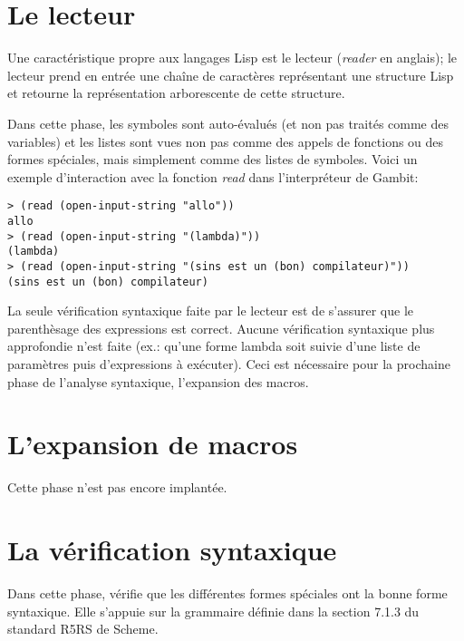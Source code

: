 \documentclass[11pt]{report}
\begin{document}
\section{Le lecteur}

Une caractéristique propre aux langages Lisp est le lecteur
(\emph{reader} en anglais); le lecteur prend en entrée une chaîne de
caractères représentant une structure Lisp et retourne la
représentation arborescente de cette structure.

Dans cette phase, les symboles sont auto-évalués (et non pas traités
comme des variables) et les listes sont vues non pas comme des appels
de fonctions ou des formes spéciales, mais simplement comme des listes
de symboles.  Voici un exemple d'interaction avec la fonction
\emph{read} dans l'interpréteur de Gambit:

\begin{verbatim}
> (read (open-input-string "allo"))
allo
> (read (open-input-string "(lambda)"))
(lambda)
> (read (open-input-string "(sins est un (bon) compilateur)"))
(sins est un (bon) compilateur)
\end{verbatim}

La seule vérification syntaxique faite par le lecteur est de s'assurer
que le parenthèsage des expressions est correct.  Aucune vérification
syntaxique plus approfondie n'est faite (ex.: qu'une forme lambda soit
suivie d'une liste de paramètres puis d'expressions à exécuter).  Ceci
est nécessaire pour la prochaine phase de l'analyse syntaxique,
l'expansion des macros.


\section{L'expansion de macros}

Cette phase n'est pas encore implantée.


\section{La vérification syntaxique}

Dans cette phase, \sins vérifie que les différentes formes spéciales
ont la bonne forme syntaxique.  Elle s'appuie sur la grammaire définie
dans la section 7.1.3 du standard R5RS de Scheme.
\end{document}
